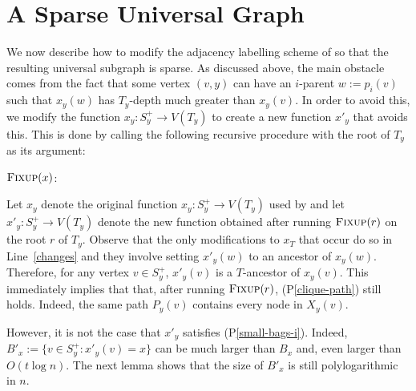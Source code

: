 \documentclass{patmorin}
\newcommand{\pref}[1]{(P\ref{#1})}
\begin{document}
\section{A Sparse Universal Graph}

We now describe how to modify the adjacency labelling scheme of \citet{dujmovic.esperet.ea:adjacency} so that the resulting universal subgraph is sparse.  As discussed above, the main obstacle comes from the fact that some vertex $(v,y)$ can have an $i$-parent $w:=p_i(v)$ such that $x_y(w)$ has $T_y$-depth much greater than $x_y(v)$.  In order to avoid this, we modify the function $x_y:S^+_y\to V(T_y)$ to create a new function $x'_y$ that avoids this. This is done by calling the following recursive procedure with the root of $T_y$ as its argument:

\noindent
\begin{minipage}{\textwidth}
    $\textsc{Fixup}(x)$:
    \begin{algorithmic}[1]
                \ENDIF
            \ENDFOR
        \ENDFOR
    \end{algorithmic}
\end{minipage}

Let $x_y$ denote the original function $x_y:S^+_y\to V(T_y)$ used by \citet{dujmovic.esperet.ea:adjacency} and let $x'_y:S^+_y\to V(T_y)$ denote the new function obtained after running $\textsc{Fixup}(r)$ on the root $r$ of $T_y$.  Observe that the only modifications to $x_T$ that occur do so in Line~\ref{changes} and they involve setting $x'_y(w)$ to an ancestor of $x_y(w)$.  Therefore, for any vertex $v\in S^+_y$, $x'_y(v)$ is a $T$-ancestor of $x_y(v)$.  This immediately implies that that, after running $\textsc{Fixup}(r)$, \pref{clique-path} still holds. Indeed, the same path $P_y(v)$ contains every node in $X_y(v)$.

However, it is not the case that $x'_y$ satisfies \pref{small-bags-i}.  Indeed, $B'_x:=\{v\in S^+_y: x'_y(v)=x\}$ can be much larger than $B_x$ and, even larger than $O(t\log n)$.  The next lemma shows that the size of $B'_x$ is still polylogarithmic in $n$.
\end{document}
